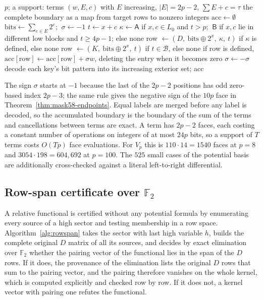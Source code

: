 \documentclass[11pt]{article}
\theoremstyle{definition}
\theoremstyle{remark}
\begin{document}
\begin{algorithm}[t]
\caption{Bitset differential of a source support, in exact integer arithmetic.}
\label{alg:bitset}
\begin{algorithmic}[1]
\Require $p$; a support: terms $(w,E,c)$ with $E$ increasing, $|E|=2p-2$, $\sum E+c=\tau$
\Ensure the complete boundary as a map from target rows to nonzero integers
\State $\mathrm{acc}\gets\emptyset$
  \State $\mathrm{bits}\gets\sum_{e\in E}2^{e}$; $\ \sigma\gets-1$
    \State $t\gets x+c$
      \State $\kappa\gets\mathsf A$ if $x,c\in L_0$ and $t>p$; $\ \mathsf B$ if $x,c$ lie in different low blocks and $t\geq4p-1$; else none
      \State row $\gets(D,\ \mathrm{bits}\oplus2^{x},\ \kappa,\ t)$ if $\kappa$ is defined, else none
    \Else
      \State row $\gets(K,\ \mathrm{bits}\oplus2^{x},\ t)$ if $t\in\mathcal B$, else none
    \EndIf
    \State if row is defined, $\mathrm{acc}[\text{row}]\gets\mathrm{acc}[\text{row}]+\sigma w$, deleting the entry when it becomes zero
    \State $\sigma\gets-\sigma$
  \EndFor
\EndFor
\State decode each key's bit pattern into its increasing exterior set; \Return acc
\end{algorithmic}
\end{algorithm}

The sign $\sigma$ starts at $-1$ because the last of the $2p-2$ positions has odd
zero-based index $2p-3$; the same rule gives the negative sign of the $10p$ face in
Theorem~\ref{thm:mask58-endpoints}. Equal labels are merged before any label is decoded,
so the accumulated boundary is the boundary of the sum of the terms and cancellations
between terms are exact. A term has $2p-2$ faces, each costing a constant number of operations on integers of at
most $24p$ bits, so a support of $T$ terms costs $O(Tp)$ face evaluations. For $V_p$
this is $110\cdot14=1540$ faces at $p=8$ and $3054\cdot198=604{,}692$ at $p=100$.
The $525$ small cases of the potential basis are additionally cross-checked
against a literal left-to-right differential.

\subsection{Row-span certificate over \texorpdfstring{$\mathbb F_2$}{F2}}

A relative functional is certified without any potential formula by enumerating
every source of a high sector and testing membership in a row space.
Algorithm~\ref{alg:rowspan} takes the sector with last high variable $h$, builds the
complete original $D$ matrix of all its sources, and decides by exact elimination
over $\mathbb F_2$ whether the pairing vector of the functional lies in the span of
the $D$ rows. If it does, the provenance of the elimination lists the original $D$
rows that sum to the pairing vector, and the pairing therefore vanishes on the whole
kernel, which is computed explicitly and checked row by row. If it does not, a
kernel vector with pairing one refutes the functional.
\end{document}
